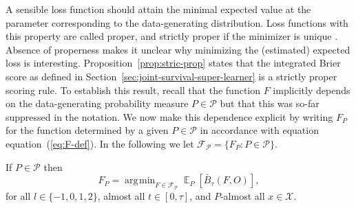 \documentclass[alpha-refs]{wiley-article}
\DeclareMathOperator{\E}{\mathbb{E}} %
\newcommand{\1}{\mathbb{1}} %
\DeclareMathOperator*{\argmin}{\arg\!\min}
\begin{document}
A sensible loss function should attain the minimal expected value at
the parameter corresponding to the data-generating distribution. Loss
functions with this property are called proper, and strictly proper if
the minimizer is unique \citep{gneiting2007strictly}. Absence of
properness makes it unclear why minimizing the (estimated) expected
loss is interesting.  Proposition~\ref{prop:stric-prop} states that
the integrated Brier score as defined in
Section~\ref{sec:joint-survival-super-learner} is a strictly proper
scoring rule. To establish this result, recall that the function \(F\)
implicitly depends on the data-generating probability measure
\(P\in\mathcal P\) but that this was so-far suppressed in the
notation. We now make this dependence explicit by writing \(F_P\) for
the function determined by a given \(P \in\mathcal{P}\) in accordance
with equation equation~(\ref{eq:F-def}). In the following we let \(
\mathcal{F}_{\mathcal{P}} = \{F_P : P \in \mathcal{P}\} \).

\begin{proposition}
  \label{prop:stric-prop}
  If \(P \in\mathcal{P}\) then
  \begin{equation*}
    F_P = \argmin_{F \in \mathcal{F}_{\mathcal{P}}}
    \E_P{[\bar{B}_\tau(F, O)]}
    ,
  \end{equation*}
  for all \( l \in \{-1, 0, 1, 2 \} \), almost all
  \( t \in [0,\tau] \), and \( P \)-almost all
  \( x \in \mathcal{X} \).
\end{proposition}
\end{document}

